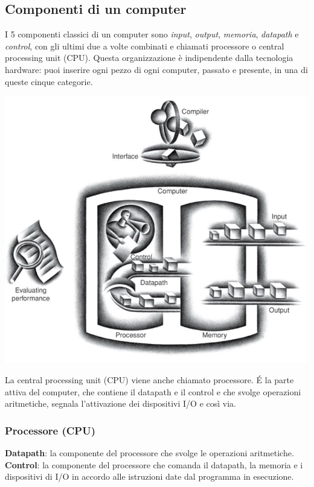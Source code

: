 \documentclass[12pt,a4paper]{article}
\begin{document}
\subsection{Componenti di un computer}
I 5 componenti classici di un computer sono \textsl{input}, \textsl{output}, \textsl{memoria}, \textsl{datapath} e \textsl{control}, con gli ultimi due a volte combinati e chiamati processore o central processing unit (CPU). Questa organizzazione è indipendente dalla tecnologia hardware: puoi inserire ogni pezzo di ogni computer, passato e presente, in una di queste cinque categorie.
\begin{center}
\includegraphics[width=0.6\columnwidth]{img/computer_component.png}
\end{center}
La central processing unit (CPU) viene anche chiamato processore. \'E la parte attiva del computer, che contiene il datapath e il control e che svolge operazioni aritmetiche, segnala l'attivazione dei dispositivi I/O e così via.

\subsubsection{Processore (CPU)}
\textbf{Datapath}: la componente del processore che svolge le operazioni aritmetiche.\\
\textbf{Control}: la componente del processore che comanda il datapath, la memoria e i dispositivi di I/O in accordo alle istruzioni date dal programma in esecuzione.
\end{document}
